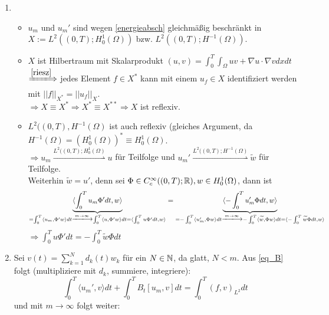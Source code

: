 	\begin{enumerate}[1)]
		\item \begin{itemize}
			\item $u_m$ und $u_m'$ sind wegen \ref{energieabsch} gleichmäßig beschränkt in $X:= L^2((0,T);H_0^1(\Omega))$ bzw. $L^2((0,T);H^{-1}(\Omega))$.
			\item $X$ ist Hilbertraum mit Skalarprodukt $(u,v) = \int_{0}^{T} \int_{\Omega} uv + \nabla u \cdot \nabla v dx dt$ \\
			$\xLongrightarrow{\ref{riesz}}$ jedes Element $f \in X^*$ kann mit einem $u_f \in X$ identifiziert werden mit $||f||_{X^*} = ||u_f||_X$. \\
			$\Rightarrow X \equiv X^* \Rightarrow X^* \equiv X^{**} \Rightarrow X$ ist reflexiv. 
			\item $L^2((0,T),H^{-1}(\Omega)$ ist auch reflexiv (gleiches Argument, da $H^{-1}(\Omega) = (H_0^1(\Omega))^* \equiv H_0^1(\Omega)$.\\
			$\Rightarrow u_m \overset{L^2((0,T);H_0^1(\Omega)}{\rightharpoonup} u$ für Teilfolge und $u_m' \overset{L^2((0,T);H^{-1}(\Omega)}{\rightharpoonup} \widetilde{w}$ für Teilfolge. \\
			Weiterhin $\widetilde{w} = u'$, denn sei $\Phi \in C_c^\infty((0,T);\mathbb{R}), w \in H_0^1(\Omega)$, dann ist
			\[ \underbrace{\langle \int_{0}^{T} u_m \Phi' dt, w \rangle}_{=\int_{0}^{T} \langle u_m, \Phi' w \rangle dt \xlongrightarrow{m \rightarrow \infty} \int_{0}^{T} \langle u,\Phi' w \rangle dt = \langle \int_{0}^{T} u \Phi' dt,w \rangle} = \underbrace{\langle - \int_{0}^{T} u_m' \Phi dt,w \rangle}_{= - \int_{0}^{T} \langle u_m',\Phi w\rangle dt \xlongrightarrow{m \rightarrow \infty} - \int_{0}^{T} \langle \widetilde{w},\Phi w \rangle dt = \langle -\int_{0}^{T} \widetilde{w} \Phi dt, w \rangle}  \]
			$\Rightarrow \int_{0}^{T} u \Phi' dt = -\int_{0}^{T} \widetilde{w} \Phi dt$
		\end{itemize}
		\item Sei $v(t) = \sum_{k=1}^{N} d_k(t) w_k$ für ein $N \in \mathbb{N}$, da glatt, $N < m$. Aus \eqref{eq_B} folgt (multipliziere mit $d_k$, summiere, integriere):
		\begin{equation}
			\int_{0}^{T} \langle u_m',v \rangle dt + \int_{0}^{T} B_t [u_m,v] dt = \int_{0}^{T} (f,v)_{L^2} dt \label{eq_gronwall_stern}
		\end{equation}
		und mit $m \rightarrow \infty$ folgt weiter:
		\begin{equation}

\end{equation}
\end{enumerate}
